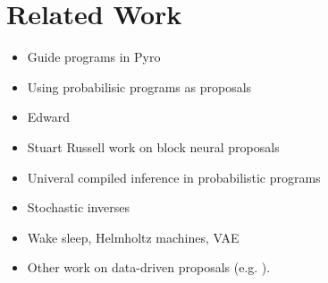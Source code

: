 \section{Related Work}
\begin{itemize}
\item Guide programs in Pyro
\item Using probabilisic programs as proposals \cite{cusumano2018using}
\item Edward \cite{tran2016edward}
\item Stuart Russell work on block neural proposals \cite{wang2017neural}
\item Univeral compiled inference in probabilistic programs \cite{le2016inference}
\item Stochastic inverses \cite{stuhlmuller2013learning}
\item Wake sleep, Helmholtz machines, VAE
\item Other work on data-driven proposals (e.g. \cite{tu2002image}).
\end{itemize}
